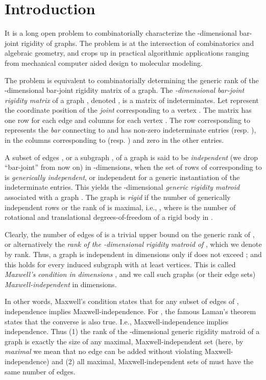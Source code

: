 \documentclass[10pt]{article}
\begin{document}
\section{Introduction}\label{sec:intro}
It is a long open problem to combinatorially characterize the -dimensional bar-joint rigidity of graphs.
The problem is at the intersection of combinatorics and
algebraic geometry, and  crops up in practical algorithmic applications ranging from
mechanical computer aided design to
molecular modeling.

\medskip\noindent
The problem is equivalent to combinatorially determining
the generic rank of the -dimensional bar-joint rigidity matrix of a graph.
The {\em -dimensional bar-joint rigidity matrix} of a graph  , denoted ,
is a matrix of indeterminates. Let  represent the coordinate position  of
the {\em joint} corresponding to a
vertex .
The matrix  has one row for each edge  and  columns for
each vertex .
The row corresponding to 
represents the {\em bar}
connecting  to  and has  non-zero indeterminate entries
 (resp. ), in the  columns corresponding to 
(resp. ) and zero in the other entries.

\medskip\noindent
A subset of edges , or a subgraph , of a graph  is said to be {\em independent} (we drop ``bar-joint'' from now on) in -dimensions, when the set of rows of  corresponding to  is {\em generically independent}, or independent for a generic instantiation of the indeterminate entries.
This yields the -dimensional {\em generic rigidity matroid} associated with a graph . The graph is {\em rigid} if the number of generically independent rows or
the rank of   is maximal, i.e., , where
 is the number of rotational and translational degrees-of-freedom of a rigid body in  \cite{graver:servatius:rigidityBook:1993}.

\medskip\noindent
Clearly, the number of edges of  is a trivial upper bound on the generic rank of
, or alternatively the {\it rank of the -dimensional rigidity matroid of }, which we denote by rank. Thus, a graph is independent in  dimensions only if   does not exceed ; and  this holds for every induced subgraph with at least  vertices. This is called {\em Maxwell's condition in  dimensions} \cite{maxwell:equilibrium:1864}, and we call such graphs (or their edge sets)  {\em Maxwell-independent} in  dimensions. 

\medskip\noindent
In other words, Maxwell's condition states that for any subset of edges of
, independence implies Maxwell-independence. For , the famous Laman's theorem states that the converse is also true. I.e., Maxwell-independence implies independence.
Thus (1) the rank of the -dimensional generic rigidity matroid of a graph  is exactly the size of any maximal, Maxwell-independent set (here, by {\em maximal} we mean that no edge can be added without violating Maxwell-independence) and (2) all maximal, Maxwell-independent sets of  must have the same number of edges.
\end{document}
